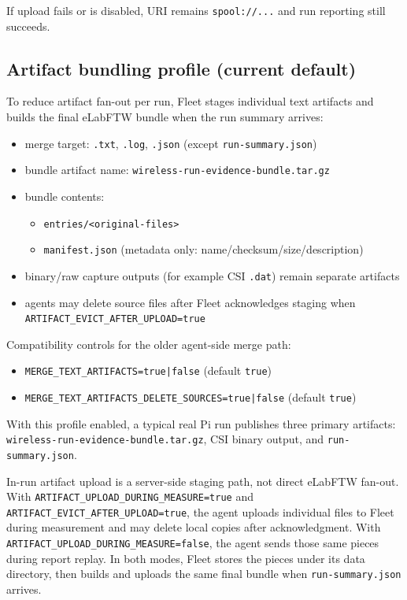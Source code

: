 \documentclass[11pt,a4paper]{article}
\begin{document}
If upload fails or is disabled, URI remains \texttt{spool://...} and run reporting still succeeds.

\subsection{Artifact bundling profile (current default)}
To reduce artifact fan-out per run, Fleet stages individual text artifacts and builds the final eLabFTW bundle when the run summary arrives:
\begin{itemize}
  \item merge target: \texttt{.txt}, \texttt{.log}, \texttt{.json} (except \texttt{run-summary.json})
  \item bundle artifact name: \texttt{wireless-run-evidence-bundle.tar.gz}
  \item bundle contents:
    \begin{itemize}
      \item \texttt{entries/<original-files>}
      \item \texttt{manifest.json} (metadata only: name/checksum/size/description)
    \end{itemize}
  \item binary/raw capture outputs (for example CSI \texttt{.dat}) remain separate artifacts
  \item agents may delete source files after Fleet acknowledges staging when \texttt{ARTIFACT\_EVICT\_AFTER\_UPLOAD=true}
\end{itemize}

Compatibility controls for the older agent-side merge path:
\begin{itemize}
  \item \texttt{MERGE\_TEXT\_ARTIFACTS=true|false} (default \texttt{true})
  \item \texttt{MERGE\_TEXT\_ARTIFACTS\_DELETE\_SOURCES=true|false} (default \texttt{true})
\end{itemize}

With this profile enabled, a typical real Pi run publishes three primary artifacts:
\texttt{wireless-run-evidence-bundle.tar.gz}, CSI binary output, and \texttt{run-summary.json}.

In-run artifact upload is a server-side staging path, not direct eLabFTW fan-out. With \texttt{ARTIFACT\_UPLOAD\_DURING\_MEASURE=true} and \texttt{ARTIFACT\_EVICT\_AFTER\_UPLOAD=true}, the agent uploads individual files to Fleet during measurement and may delete local copies after acknowledgment. With \texttt{ARTIFACT\_UPLOAD\_DURING\_MEASURE=false}, the agent sends those same pieces during report replay. In both modes, Fleet stores the pieces under its data directory, then builds and uploads the same final bundle when \texttt{run-summary.json} arrives.
\end{document}
